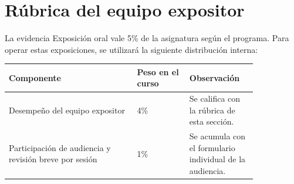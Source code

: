 \documentclass[11pt]{article}
\begin{document}
\section{Rúbrica del equipo expositor}
La evidencia Exposición oral vale 5\% de la asignatura según el programa. Para operar estas exposiciones, se utilizará la siguiente distribución interna:

\begin{center}
\begin{tabular}{p{0.44\linewidth} p{0.18\linewidth} p{0.22\linewidth}}
\toprule
\textbf{Componente} & \textbf{Peso en el curso} & \textbf{Observación} \\
\midrule
Desempeño del equipo expositor & 4\% & Se califica con la rúbrica de esta sección. \\
Participación de audiencia y revisión breve por sesión & 1\% & Se acumula con el formulario individual de la audiencia. \\
\bottomrule
\end{tabular}
\end{center}
\end{document}
